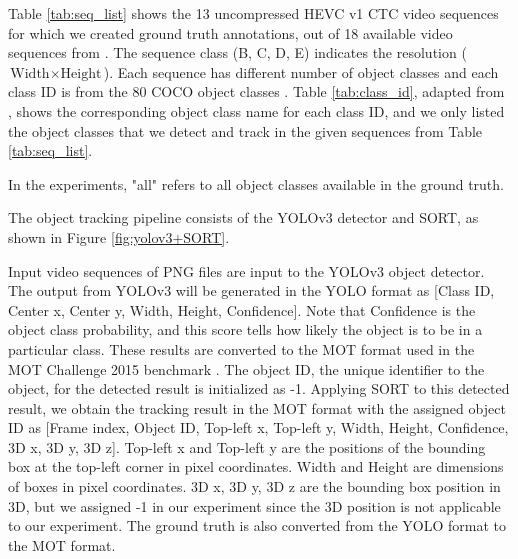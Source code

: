 
Table \ref{tab:seq_list} shows the 13 uncompressed HEVC v1 CTC video sequences for which we created ground truth annotations, out of 18 available video sequences from \cite{choi_dataset_2021}. The sequence class (B, C, D, E) indicates the resolution ($\text{Width} \times \text{Height}$). Each sequence has different number of object classes and each class ID is from the 80 COCO object classes \cite{lin_microsoft_2014}. Table \ref{tab:class_id}, adapted from \cite{choi_dataset_2021}, shows the corresponding object class name for each class ID, and we only listed the object classes that we detect and track in the given sequences from Table \ref{tab:seq_list}.

In the experiments, "all" refers to all object classes available in the ground truth.

The object tracking pipeline consists of the YOLOv3 detector and SORT, as shown in Figure \ref{fig:yolov3+SORT}. 

Input video sequences of PNG files are input to the YOLOv3 object detector. The output from YOLOv3 will be generated in the YOLO format as [Class ID, Center x, Center y, Width, Height, Confidence]. Note that Confidence is the object class probability, and this score tells how likely the object is to be in a particular class. These results are converted to the MOT format used in the MOT Challenge 2015 benchmark \cite{leal-taixe_motchallenge_2015}. The object ID, the unique identifier to the object, for the detected result is initialized as -1. Applying SORT to this detected result, we obtain the tracking result in the MOT format with the assigned object ID as [Frame index, Object ID, Top-left x, Top-left y, Width, Height, Confidence, 3D x, 3D y, 3D z]. Top-left x and Top-left y are the positions of the bounding box at the top-left corner in pixel coordinates. Width and Height are dimensions of boxes in pixel coordinates. 3D x, 3D y, 3D z are the bounding box position in 3D, but we assigned -1 in our experiment since the 3D position is not applicable to our experiment. The ground truth is also converted from the YOLO format to the MOT format.



